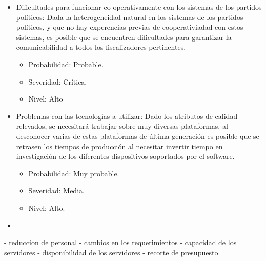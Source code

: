 \begin{itemize}
\item Dificultades para funcionar co-operativamente con los sistemas de los partidos pol\'iticos: Dada la heterogeneidad natural en los sistemas de los partidos pol\'iticos, y que no hay experencias previas de cooperativiadad con estos sistemas, es posible que se encuentren dificultades para garantizar la comunicabilidad a todos los fiscalizadores pertinentes. \begin{itemize}                                                                                                                                                                                                                                                                                                                                                                            									   \item Probabilidad: Probable.
                                                                           \item Severidad: Cr\'itica.
									   \item Nivel: Alto								\end{itemize}

\bigskip

\item Problemas con las tecnolog\'ias a utilizar: Dado los atributos de calidad relevados, se necesitar\'a trabajar sobre muy diversas plataformas, al desconocer varias de estas plataformas de \'ultima generaci\'on es posible que se retrasen los tiempos de producci\'on al necesitar invertir tiempo en investigaci\'on de los diferentes dispositivos soportados por el software. 
\begin{itemize}
\item Probabilidad: Muy probable.
\item Severidad: Media.
\item Nivel: Alto.
\end{itemize}

\bigskip

\item 

\end{itemize}

- reduccion de personal
- cambios en los requerimientos
- capacidad de los servidores
- disponibilidad de los servidores
- recorte de presupuesto